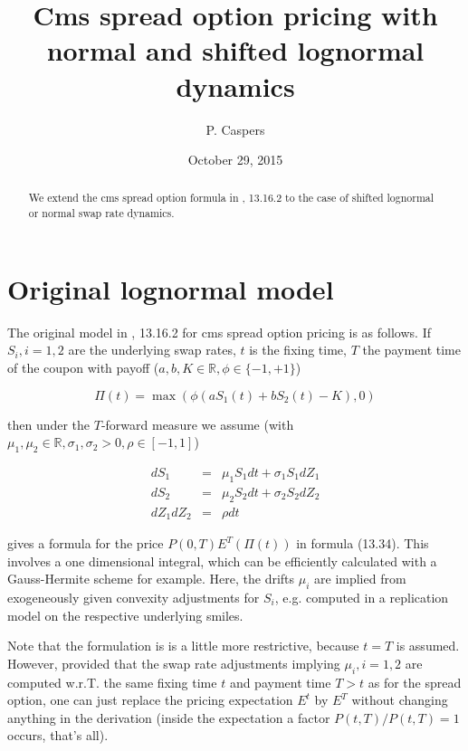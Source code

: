 \documentclass{amsart}
\theoremstyle{plain}
\numberwithin{equation}{section}
\begin{document}
\title[Cms spread option pricing with normal and shifted lognormal dynamics]{Cms spread option pricing with normal and shifted lognormal dynamics}
\author{P. Caspers}
\date{October 29, 2015}
\begin{abstract}
We extend the cms spread option formula in \cite{brigo}, 13.16.2 to the case of shifted lognormal or normal swap rate dynamics.
\end{abstract}

\maketitle

\tableofcontents

\section{Original lognormal model}

The original model in \cite{brigo}, 13.16.2 for cms spread option pricing is as follows. If $S_i, i=1,2$ are the underlying swap rates, $t$ is the fixing time, $T$ the payment time of the coupon with payoff ($a,b,K \in \mathbb{R}, \phi\in\{-1,+1\}$)

\begin{equation}
\Pi(t) = \max( \phi (a S_1(t) + b S_2(t) - K), 0 )
\end{equation}

then under the $T$-forward measure we assume (with $\mu_1, \mu_2 \in \mathbb{R}, \sigma_1, \sigma_2 > 0, \rho \in [-1,1]$)

\begin{eqnarray}\label{origmodel}
dS_1 &=& \mu_1 S_1 dt + \sigma_1 S_1 dZ_1 \\
dS_2 &=& \mu_2 S_2 dt + \sigma_2 S_2 dZ_2 \\
dZ_1 dZ_2 &=& \rho dt
\end{eqnarray}

\cite{brigo} gives a formula for the price $P(0,T) E^T ( \Pi(t) )$ in formula (13.34). This involves a one dimensional integral, which can be efficiently calculated with a Gauss-Hermite scheme for example. Here, the drifts $\mu_i$ are implied from exogeneously given convexity adjustments for $S_i$, e.g. computed in a replication model on the respective underlying smiles.

Note that the formulation is \cite{brigo} is a little more restrictive, because $t=T$ is assumed. However, provided that the swap rate adjustments implying $\mu_i, i=1,2$ are computed w.r.T. the same fixing time $t$ and payment time $T>t$ as for the spread option, one can just replace the pricing expectation $E^t$ by $E^T$ without changing anything in the derivation (inside the expectation a factor $P(t,T) / P(t,T) = 1$ occurs, that's all).
\end{document}
